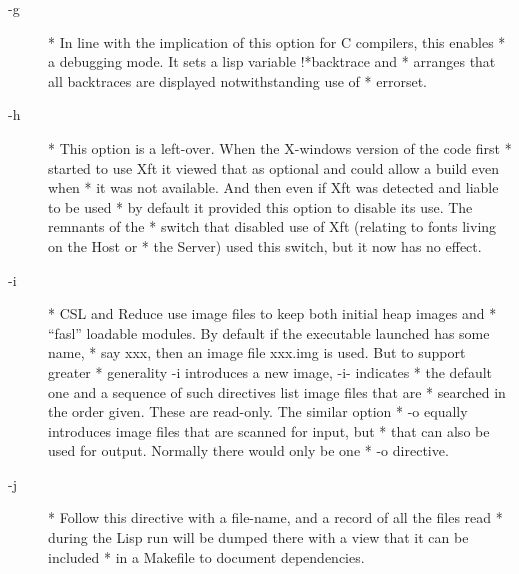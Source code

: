 \documentclass[a4paper,11pt]{article}
\begin{document}
\begin{description}
\item [{\ttfamily -g}] 
          * In line with the implication of this option for C compilers, this enables
          * a debugging mode. It sets a lisp variable {\ttfamily !*backtrace} and
          * arranges that all backtraces are displayed notwithstanding use of
          * {\ttfamily errorset}.

\item [{\ttfamily -h}] 
          * This option is a left-over. When the X-windows version of the code first
          * started to use Xft it viewed that as optional and could allow a build even when
          * it was not available. And then even if Xft was detected and liable to be used
          * by default it provided this option to disable its use. The remnants of the
          * switch that disabled use of Xft (relating to fonts living on the Host or
          * the Server) used this switch, but it now has no effect.

\item [{\ttfamily -i}] 
          * CSL and Reduce use image files to keep both initial heap images and
          * ``fasl'' loadable modules. By default if the executable launched has some name,
          * say xxx, then an image file xxx.img is used. But to support greater
          * generality {\ttfamily -i} introduces a new image, {\ttfamily -i-} indicates
          * the default one and a sequence of such directives list image files that are
          * searched in the order given. These are read-only. The similar option
          * {\ttfamily -o} equally introduces image files that are scanned for input, but
          * that can also be used for output. Normally there would only be one
          * {\ttfamily -o} directive.

\item [{\ttfamily -j}] 
          * Follow this directive with a file-name, and a record of all the files read
          * during the Lisp run will be dumped there with a view that it can be included
          * in a Makefile to document dependencies.


\end{description}
\end{document}
